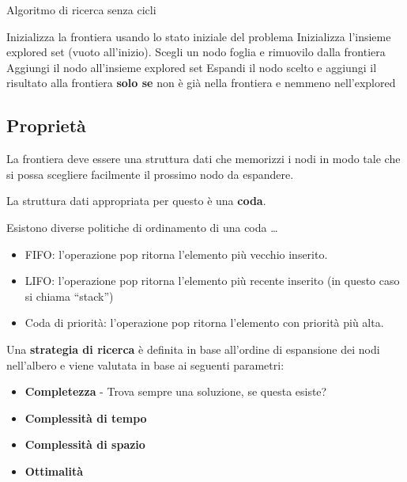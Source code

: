 \begin{algorithm}
    \caption{Algoritmo di ricerca senza cicli}
    \label{alg:search2}
    \begin{algorithmic}[1] %
         
			\State Inizializza la frontiera usando lo stato iniziale del problema
			\State Inizializza l'insieme explored set (vuoto all'inizio).
            \Loop
              \EndIf
            \State Scegli un nodo foglia e rimuovilo dalla frontiera
              \EndIf
			\State Aggiungi il nodo all'insieme explored set
            \State Espandi il nodo scelto e aggiungi il risultato alla
frontiera \textbf{solo se} non è già nella frontiera e nemmeno nell'explored 
			\EndLoop
        \EndProcedure
    \end{algorithmic}
\end{algorithm}

\subsection{Proprietà}

La frontiera deve essere una struttura dati che memorizzi i nodi in modo tale
che si possa scegliere facilmente il prossimo nodo da espandere.

La struttura dati appropriata per questo è una \textbf{coda}.

Esistono diverse politiche di ordinamento di una coda \dots

\begin{itemize}
\item FIFO: l'operazione pop ritorna l'elemento più vecchio inserito.
\item LIFO: l'operazione pop ritorna l'elemento più recente inserito (in questo
caso si chiama ``stack'')
\item Coda di priorità: l'operazione pop ritorna l'elemento con priorità più alta.
\end{itemize}

Una \textbf{strategia di ricerca} è definita in base all'ordine di espansione
dei nodi nell'albero e viene valutata in base ai seguenti parametri:

\begin{itemize}
\item \textbf{Completezza} - Trova sempre una soluzione, se questa esiste?
\item \textbf{Complessità di tempo}
\item \textbf{Complessità di spazio}
\item \textbf{Ottimalità}
\end{itemize}

